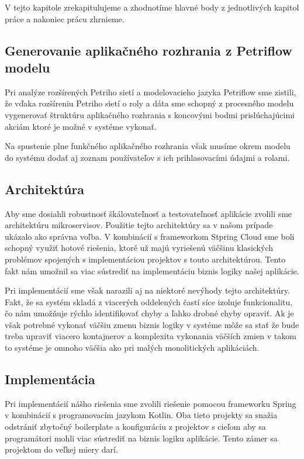 V tejto kapitole zrekapitulujeme a zhodnotíme hlavné body z jednotlivých kapitol práce  a nakoniec prácu zhrnieme. 

\subsection{Generovanie aplikačného rozhrania z Petriflow modelu}
Pri analýze rozšírených Petriho sietí a modelovacieho jazyka Petriflow sme zistili, že vďaka rozšíreniu Petriho sietí o roly a dáta sme schopný z procesného modelu vygenerovať štruktúru aplikačného rozhrania s koncovými bodmi prislúchajúcimi akciám ktoré je možné v systéme vykonať.

Na spustenie plne funkčného aplikačného rozhrania však musíme okrem modelu do systému dodať aj zoznam používateľov s ich prihlasovacími údajmi a rolami.

\subsection{Architektúra}
Aby sme dosiahli robustnosť škálovateľnosť a testovateľnosť aplikácie zvolili sme architektúru mikroservisov. Použitie tejto architektúry sa v našom prípade ukázalo ako správna voľba. V kombinácií s frameworkom Stpring Cloud sme boli schopný využiť hotové riešenia, ktoré už majú vyriešenú väčšinu klasických problémov spojených s implementáciou projektov s touto architektúrou. Tento fakt nám umožnil sa viac sústrediť na implementáciu biznis logiky našej aplikácie.

Pri implementácií sme však narazili aj na niektoré nevýhody tejto architektúry. Fakt, že sa systém skladá z viacerých oddelených častí síce izoluje funkcionalitu, čo nám umožňuje rýchlo identifikovať chyby a ľahko drobné chyby opraviť. Ak je však potrebné vykonať väčšiu zmenu biznis logiky v systéme môže sa stať že bude treba upraviť viacero kontajnerov a komplexita vykonania väčších zmien v takom to systéme je omnoho väčšia ako pri malých monolitických aplikáciách.

\subsection{Implementácia}
Pri implementácií nášho riešenia sme zvolili riešenie pomocou frameworku Spring v kombinácií s programovacím jazykom Kotlin. Oba tieto projekty sa snažia odstrániť zbytočný boilerplate a konfiguráciu z projektov s cieľom aby sa programátori mohli viac sústrediť na biznis logiku aplikácie. Tento zámer sa projektom do veľkej miery darí. 

